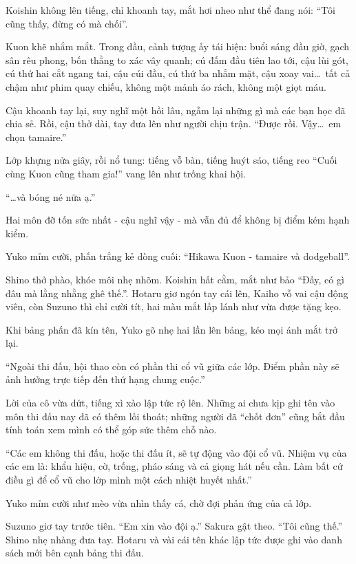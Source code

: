 \documentclass[../main.tex]{subfiles}
\begin{document}
Koishin không lên tiếng, chỉ khoanh tay, mắt hơi nheo như thể đang nói: ``Tôi cũng thấy, đừng có mà chối''.

Kuon khẽ nhắm mắt. Trong đầu, cảnh tượng ấy tái hiện: buổi sáng đầu giờ, gạch sân rêu phong, bốn thằng to xác vây quanh; cú đấm đầu tiên lao tới, cậu lùi gót, cú thứ hai cắt ngang tai, cậu cúi đầu, cú thứ ba nhắm mặt, cậu xoay vai\dots\ tất cả chậm như phim quay chiếu, không một mảnh áo rách, không một giọt máu.

Cậu khoanh tay lại, suy nghĩ một hồi lâu, ngẫm lại những gì mà các bạn học đã chia sẻ. Rồi, cậu thở dài, tay đưa lên như người chịu trận. ``Được rồi. Vậy\dots\ em chọn tamaire.''

Lớp khựng nửa giây, rồi nổ tung: tiếng vỗ bàn, tiếng huýt sáo, tiếng reo ``Cuối cùng Kuon cũng tham gia!'' vang lên như trống khai hội.

``\dots và bóng né nữa ạ.''

Hai môn đỡ tốn sức nhất - cậu nghĩ vậy - mà vẫn đủ để không bị điểm kém hạnh kiểm.

Yuko mỉm cười, phấn trắng kẻ dòng cuối: ``Hikawa Kuon - tamaire và dodgeball''.

Shino thở phào, khóe môi nhẹ nhõm. Koishin hất cằm, mắt như bảo ``Đấy, có gì đâu mà lằng nhằng ghê thế.''. Hotaru giơ ngón tay cái lên, Kaiho vỗ vai cậu động viên, còn Suzuno thì chỉ cười tít, hai màu mắt lấp lánh như vừa được tặng kẹo.

\ct

Khi bảng phấn đã kín tên, Yuko gõ nhẹ hai lần lên bảng, kéo mọi ánh mắt trở lại.

``Ngoài thi đấu, hội thao còn có phần thi cổ vũ giữa các lớp. Điểm phần này sẽ ảnh hưởng trực tiếp đến thứ hạng chung cuộc.''

Lời của cô vừa dứt, tiếng xì xào lập tức rộ lên. Những ai chưa kịp ghi tên vào môn thi đấu nay đã có thêm lối thoát; những người đã ``chốt đơn'' cũng bắt đầu tính toán xem mình có thể góp sức thêm chỗ nào.

``Các em không thi đấu, hoặc thi đấu ít, sẽ tự động vào đội cổ vũ. Nhiệm vụ của các em là: khẩu hiệu, cờ, trống, pháo sáng và cả giọng hát nếu cần. Làm bất cứ điều gì để cổ vũ cho lớp mình một cách nhiệt huyết nhất.''

Yuko mỉm cười như mèo vừa nhìn thấy cá, chờ đợi phản ứng của cả lớp.

Suzuno giơ tay trước tiên. ``Em xin vào đội ạ.''
Sakura gật theo. ``Tôi cũng thế.''
Shino nhẹ nhàng đưa tay. Hotaru và vài cái tên khác lập tức được ghi vào danh sách mới bên cạnh bảng thi đấu.
\end{document}
